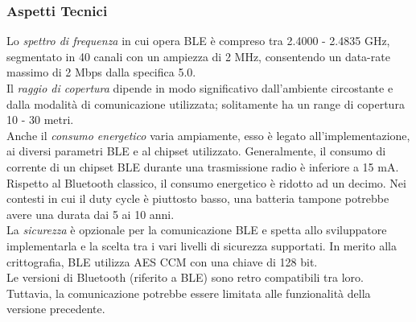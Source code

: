 \subsubsection{Aspetti Tecnici}
Lo \textit{spettro di frequenza} in cui opera BLE è compreso tra 2.4000 - 2.4835 GHz, segmentato in 40 canali con un ampiezza di 2 MHz, consentendo un data-rate massimo di 2 Mbps dalla specifica 5.0. \\
Il \textit{raggio di copertura} dipende in modo significativo dall'ambiente circostante e dalla modalità di comunicazione utilizzata; solitamente ha un range di copertura 10 - 30 metri. \\
Anche il \textit{consumo energetico} varia ampiamente, esso è legato all'implementazione, ai diversi parametri BLE e al chipset utilizzato. Generalmente, il consumo di corrente di un chipset BLE durante una trasmissione radio è inferiore a 15 mA. Rispetto al Bluetooth classico, il consumo energetico è ridotto ad un decimo. Nei contesti in cui il duty cycle è piuttosto basso, una batteria tampone potrebbe avere una durata dai 5 ai 10 anni.\\
La \textit{sicurezza} è opzionale per la comunicazione BLE e spetta allo sviluppatore implementarla e la scelta tra i vari livelli di sicurezza supportati. In merito alla crittografia, BLE utilizza AES CCM con una chiave di 128 bit.\\
Le versioni di Bluetooth (riferito a BLE) sono retro compatibili tra loro. Tuttavia, la comunicazione potrebbe essere limitata alle funzionalità della versione precedente.

